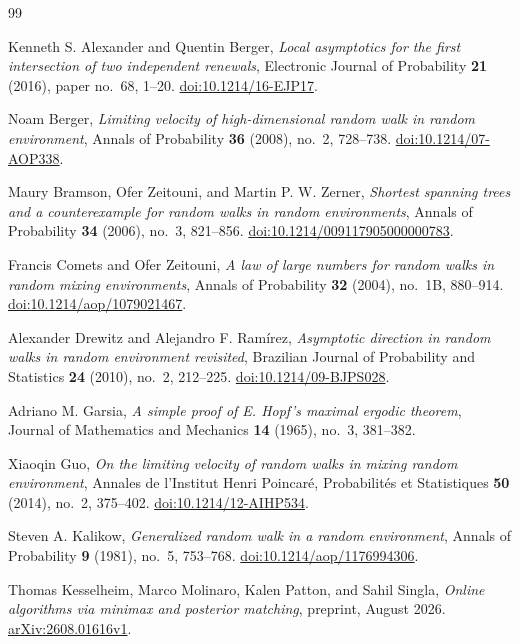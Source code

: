\begin{thebibliography}{99}

Kenneth S. Alexander and Quentin Berger,
\emph{Local asymptotics for the first intersection of two independent renewals},
Electronic Journal of Probability \textbf{21} (2016), paper no.~68, 1--20.
\href{https://doi.org/10.1214/16-EJP17}{doi:10.1214/16-EJP17}.

Noam Berger,
\emph{Limiting velocity of high-dimensional random walk in random environment},
Annals of Probability \textbf{36} (2008), no.~2, 728--738.
\href{https://doi.org/10.1214/07-AOP338}{doi:10.1214/07-AOP338}.

Maury Bramson, Ofer Zeitouni, and Martin P. W. Zerner,
\emph{Shortest spanning trees and a counterexample for random walks in random environments},
Annals of Probability \textbf{34} (2006), no.~3, 821--856.
\href{https://doi.org/10.1214/009117905000000783}{doi:10.1214/009117905000000783}.

Francis Comets and Ofer Zeitouni,
\emph{A law of large numbers for random walks in random mixing environments},
Annals of Probability \textbf{32} (2004), no.~1B, 880--914.
\href{https://doi.org/10.1214/aop/1079021467}{doi:10.1214/aop/1079021467}.

Alexander Drewitz and Alejandro F. Ram\'irez,
\emph{Asymptotic direction in random walks in random environment revisited},
Brazilian Journal of Probability and Statistics \textbf{24} (2010), no.~2, 212--225.
\href{https://doi.org/10.1214/09-BJPS028}{doi:10.1214/09-BJPS028}.

Adriano M. Garsia,
\emph{A simple proof of E. Hopf's maximal ergodic theorem},
Journal of Mathematics and Mechanics \textbf{14} (1965), no.~3, 381--382.

Xiaoqin Guo,
\emph{On the limiting velocity of random walks in mixing random environment},
Annales de l'Institut Henri Poincar\'e, Probabilit\'es et Statistiques
\textbf{50} (2014), no.~2, 375--402.
\href{https://doi.org/10.1214/12-AIHP534}{doi:10.1214/12-AIHP534}.

Steven A. Kalikow,
\emph{Generalized random walk in a random environment},
Annals of Probability \textbf{9} (1981), no.~5, 753--768.
\href{https://doi.org/10.1214/aop/1176994306}{doi:10.1214/aop/1176994306}.

Thomas Kesselheim, Marco Molinaro, Kalen Patton, and Sahil Singla,
\emph{Online algorithms via minimax and posterior matching},
preprint, August 2026.
\href{https://arxiv.org/abs/2608.01616v1}{arXiv:2608.01616v1}.


\end{thebibliography}
